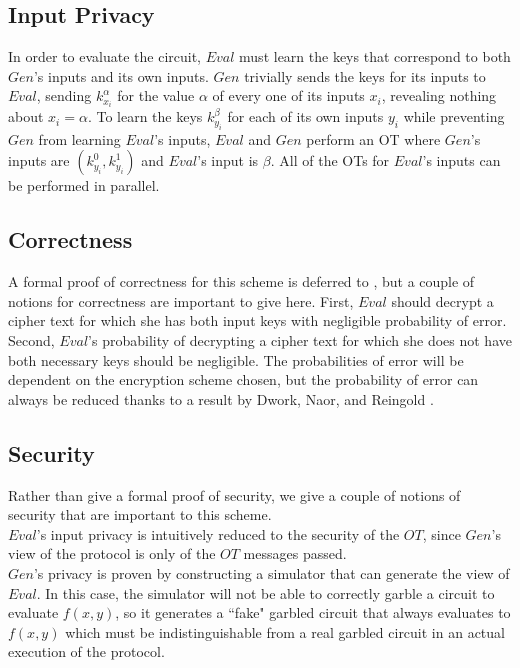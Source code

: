 \documentclass{article}
\begin{document}
\subsection{Input Privacy}

In order to evaluate the circuit, $Eval$ must learn the keys that correspond to both $Gen$'s inputs and its own inputs. $Gen$ trivially sends the keys for its inputs to $Eval$, sending $k_{x_i}^{\alpha}$ for the value $\alpha$ of every one of its inputs $x_i$, revealing nothing about $x_i=\alpha$. To learn the keys $k_{y_i}^{\beta}$ for each of its own inputs $y_i$ while preventing $Gen$ from learning $Eval$'s inputs, $Eval$ and $Gen$ perform an OT where $Gen$'s inputs are $(k_{y_i}^{0}, k_{y_i}^{1})$ and $Eval$'s input is $\beta$. All of the OTs for $Eval$'s inputs can be performed in parallel.

\subsection{Correctness}
\label{circuit-correct}

A formal proof of correctness for this scheme is deferred to \cite{yaoproof}, but a couple of notions for correctness are important to give here. First, $Eval$ should decrypt a cipher text for which she has both input keys with negligible probability of error. Second, $Eval$'s probability of decrypting a cipher text for which she does not have both necessary keys should be negligible. The probabilities of error will be dependent on the encryption scheme chosen, but the probability of error can always be reduced thanks to a result by Dwork, Naor, and Reingold \cite{immunizing}.

\subsection{Security}
Rather than give a formal proof of security, we give a couple of notions of security that are important to this scheme.  \\

$Eval$'s input privacy is intuitively reduced to the security of the $OT$, since $Gen$'s view of the protocol is only of the $OT$ messages passed. \\

$Gen$'s privacy is proven by constructing a simulator that can generate the view of $Eval$. In this case, the simulator will not be able to correctly garble a circuit to evaluate $f(x,y)$, so it generates a ``fake" garbled circuit that always evaluates to $f(x,y)$ which must be indistinguishable from a real garbled circuit in an actual execution of the protocol.
\end{document}
